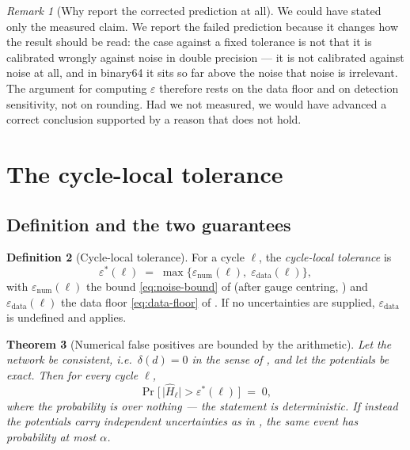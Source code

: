 \documentclass[11pt,twocolumn,a4paper]{article}
\theoremstyle{pstyle}
\newtheorem{theorem}{Theorem}[section]
\theoremstyle{definition}
\newtheorem{definition}[theorem]{Definition}
\theoremstyle{remark}
\newtheorem{remark}[theorem]{Remark}
\newcommand{\abs}[1]{\lvert#1\rvert}
\newcommand{\eps}{\varepsilon}
\newcommand{\epsnum}{\eps_{\mathrm{num}}}
\newcommand{\epsdata}{\eps_{\mathrm{data}}}
\newcommand{\epsstar}{\eps^{\ast}}
\newcommand{\hol}{H}
\begin{document}
\begin{remark}[Why report the corrected prediction at all]
\label{rem:demo}
We could have stated only the measured claim. We report the failed
prediction because it changes how the result should be read: the case
against a fixed tolerance is not that it is calibrated wrongly against
noise in double precision --- it is not calibrated against noise at all,
and in binary64 it sits so far above the noise that noise is irrelevant.
The argument for computing $\eps$ therefore rests on the data floor and
on detection sensitivity, not on rounding. Had we not measured, we would
have advanced a correct conclusion supported by a reason that does not
hold.
\end{remark}

\section{The cycle-local tolerance}
\label{sec:tolerance}

\subsection{Definition and the two guarantees}

\begin{definition}[Cycle-local tolerance]
\label{def:epsstar}
For a cycle $\ell$, the \emph{cycle-local tolerance} is
\begin{equation}
  \epsstar(\ell) \;=\; \max\bigl\{\epsnum(\ell),\;\epsdata(\ell)\bigr\},
  \label{eq:epsstar}
\end{equation}
with $\epsnum(\ell)$ the bound \eqref{eq:noise-bound} of
 (after gauge centring, ) and
$\epsdata(\ell)$ the data floor \eqref{eq:data-floor} of
. If no uncertainties are supplied, $\epsdata$ is
undefined and  applies.
\end{definition}

\begin{theorem}[Numerical false positives are bounded by the arithmetic]
\label{thm:no-false-positive}
Let the network be consistent, i.e.\ $\delta(d)=0$ in the sense of
, and let the potentials be exact. Then for every cycle
$\ell$,
\[
  \Pr\bigl[\,\abs{\widehat{\hol}_\ell} > \epsstar(\ell)\,\bigr] \;=\; 0,
\]
where the probability is over nothing --- the statement is
deterministic. If instead the potentials carry independent uncertainties
as in , the same event has probability at most
$\alpha$.
\end{theorem}
\end{document}
